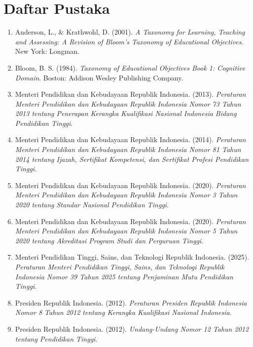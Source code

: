 \chapter*{Daftar Pustaka}
\begin{enumerate}[label={\arabic*.}]
\item Anderson, L., \& Krathwohl, D. (2001). \textit{A Taxonomy for Learning, Teaching and Assessing: A Revision of Bloom's Taxonomy of Educational Objectives}. New York: Longman.
\item Bloom, B. S. (1984). \textit{Taxonomy of Educational Objectives Book 1: Cognitive Domain}. Boston: Addison Wesley Publishing Company.
\item Menteri Pendidikan dan Kebudayaan Republik Indonesia. (2013). \textit{Peraturan Menteri Pendidikan dan Kebudayaan Republik Indonesia Nomor 73 Tahun 2013 tentang Penerapan Kerangka Kualifikasi Nasional Indonesia Bidang Pendidikan Tinggi}.
\item Menteri Pendidikan dan Kebudayaan Republik Indonesia. (2014). \textit{Peraturan Menteri Pendidikan dan Kebudayaan Republik Indonesia Nomor 81 Tahun 2014 tentang Ijazah, Sertifikat Kompetensi, dan Sertifikat Profesi Pendidikan Tinggi}.
\item Menteri Pendidikan dan Kebudayaan Republik Indonesia. (2020). \textit{Peraturan Menteri Pendidikan dan Kebudayaan Republik Indonesia Nomor 3 Tahun 2020 tentang Standar Nasional Pendidikan Tinggi}.
\item Menteri Pendidikan dan Kebudayaan Republik Indonesia. (2020). \textit{Peraturan Menteri Pendidikan dan Kebudayaan Republik Indonesia Nomor 5 Tahun 2020 tentang Akreditasi Program Studi dan Perguruan Tinggi}.
\item Menteri Pendidikan Tinggi, Sains, dan Teknologi Republik Indonesia. (2025). \textit{Peraturan Menteri Pendidikan Tinggi, Sains, dan Teknologi Republik Indonesia Nomor 39 Tahun 2025 tentang Penjaminan Mutu Pendidikan Tinggi}.
\item Presiden Republik Indonesia. (2012). \textit{Peraturan Presiden Republik Indonesia Nomor 8 Tahun 2012 tentang Kerangka Kualifikasi Nasional Indonesia}.
\item Presiden Republik Indonesia. (2012). \textit{Undang-Undang Nomor 12 Tahun 2012 tentang Pendidikan Tinggi}.
\end{enumerate}


